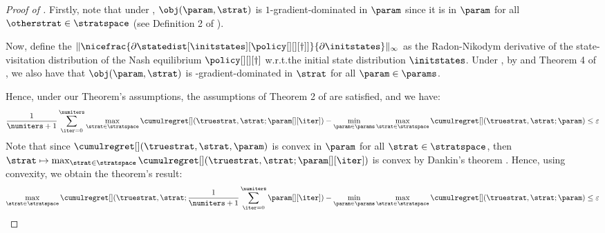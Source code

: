 \begin{proof}[Proof of ]
    Firstly, note that under , $\obj (\param, \strat)$ is $1$-gradient-dominated in $\param$ since it is  in $\param$ for all $\otherstrat \in \stratspace$ (see Definition 2 of \citet{bhandari2019global}). 

    Now, define  the  $\|\nicefrac{\partial\statedist[\initstates][{\policy[][][\dagger]}]}{\partial \initstates} \|_\infty$ as the Radon-Nikodym derivative of the state-visitation distribution of the Nash equilibrium $\policy[][][\dagger]$ w.r.t.\@ the initial state distribution $\initstates$.
    Under , by  and Theorem 4 of \citet{bhandari2019global}, we also have that $\obj (\param, \strat)$ is -gradient-dominated in $\strat$ for all $\param \in \params$.

    Hence, under our Theorem's assumptions, the assumptions of Theorem 2 of \citet{daskalakis2020independent} are satisfied, and we have:
    \begin{align}
        \frac{1}{\numiters + 1} \sum_{\iter = 0}^\numiters \max_{\strat \in \stratspace} \cumulregret[] (\truestrat, \strat; \param[][\iter]) - \min_{\substack{\param \in \params}} \max_{\strat \in \stratspace} \cumulregret[] (\truestrat, \strat; \param) \leq \varepsilon
    \end{align}
% 
% 
    Note that since $\cumulregret[] (\truestrat, \strat, \param)$ is convex in $\param$ for all $\strat \in \stratspace$, then $\strat \mapsto \max_{\strat \in \stratspace} \cumulregret[] (\truestrat, \strat; \param[][\iter])$ is convex by Dankin's theorem \cite{danskin1966thm}. Hence, using convexity, we obtain the theorem's result:
% 
    \begin{align}
         \max_{\strat \in \stratspace} \cumulregret[] (\truestrat, \strat; \frac{1}{\numiters + 1} \sum_{\iter = 0}^\numiters \param[][\iter]) - \min_{\substack{\param \in \params}} \max_{\strat \in \stratspace} \cumulregret[] (\truestrat, \strat; \param) \leq \varepsilon
    \end{align}
    

\end{proof}
